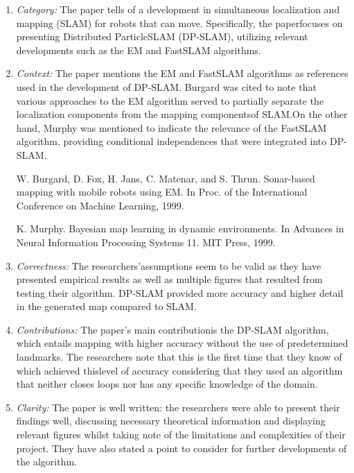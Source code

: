 \documentclass{article}
\begin{document}
\begin{enumerate}
    \item \textit{Category:} The paper tells of a development in simultaneous localization and mapping (SLAM)
    for robots that can move. Specifically, the paperfocuses on presenting Distributed ParticleSLAM (DP-SLAM), utilizing relevant developments such as the EM and FastSLAM
    algorithms.
    
    \item \textit{Context:} The paper mentions the EM and FastSLAM algorithms as references used in the
    development of DP-SLAM. Burgard was cited to note that various approaches to the EM
    algorithm served to partially separate the localization components from the mapping
    componentsof SLAM.On the other hand, Murphy was mentioned to indicate the relevance
    of the FastSLAM algorithm, providing conditional independences that were integrated into
    DP-SLAM.

    W. Burgard, D. Fox, H. Jans, C. Matenar, and S. Thrun. Sonar-based mapping with mobile
    robots using EM. In Proc. of the International Conference on Machine Learning, 1999.

    K. Murphy. Bayesian map learning in dynamic environments. In Advances in Neural
    Information Processing Systems 11. MIT Press, 1999.
    
    \item \textit{Correctness:} The researchers’assumptions seem to be valid as they have presented empirical results as
    well as multiple figures that resulted from testing their algorithm. DP-SLAM provided more
    accuracy and higher detail in the generated map compared to SLAM.

    \item \textit{Contributions:} The paper’s main contributionis the DP-SLAM algorithm, which entails mapping with higher
    accuracy without the use of predetermined landmarks. The researchers note that this is the
    first time that they know of which achieved thislevel of accuracy considering that they used
    an algorithm that neither closes loops nor has any specific knowledge of the domain.

    \item \textit{Clarity:} The paper is well written: the researchers were able to present their findings well,
    discussing necessary theoretical information and displaying relevant figures whilst taking
    note of the limitations and complexities of their project. They have also stated a point to
    consider for further developments of the algorithm.

\end{enumerate}
\end{document}
